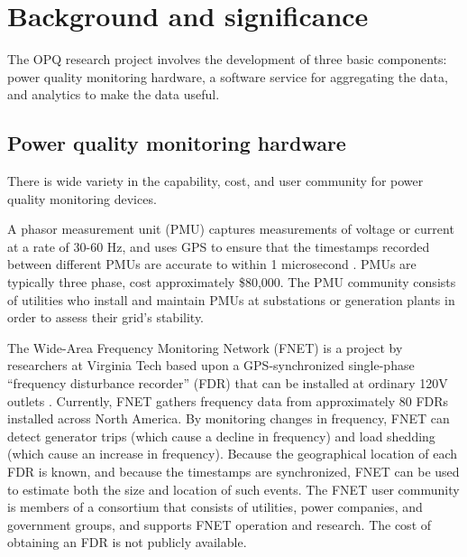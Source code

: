 
\section*{Background and significance}


The OPQ research project involves the development of three basic components: power quality monitoring hardware, a software service for aggregating the data, and analytics to make the data useful. 

\subsection*{Power quality monitoring hardware}

There is wide variety in the capability, cost, and user community for power quality monitoring devices.

A phasor measurement unit (PMU) captures measurements of voltage or current at a rate of 30-60 Hz, and uses GPS to ensure that the timestamps recorded between different PMUs are accurate to within 1 microsecond \cite{Zhang2007}. PMUs are typically three phase, cost approximately \$80,000. The PMU community
consists of utilities 
who install and maintain PMUs at substations or generation plants in order to assess their grid's stability.

The Wide-Area Frequency Monitoring Network (FNET) is a project by researchers at Virginia Tech based upon a GPS-synchronized single-phase ``frequency disturbance recorder'' (FDR) that can be installed at ordinary 120V outlets \cite{Zhang2010}. Currently, FNET gathers frequency data from approximately 80 FDRs installed across North America.  By monitoring changes in frequency, FNET can detect generator trips (which cause a decline in frequency) and load shedding (which cause an increase in frequency). Because the geographical location of each FDR is known, and because the timestamps are synchronized, FNET can be used to estimate both the size and location of such events. The FNET user community is members of a consortium that consists of utilities, power companies, and government groups, and supports FNET operation and research.  The cost of obtaining an FDR is not publicly available.

